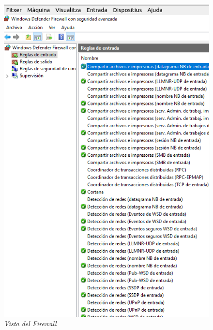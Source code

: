 \documentclass[
  a4paper,
]{article}
\begin{document}
\begin{figure}
\centering
\includegraphics{png/ADDS/ExemplesEnFirewall.png}
\caption{\emph{Vista del Firewall}}
\end{figure}
\end{document}
